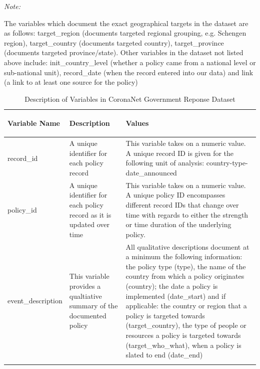 \documentclass[]{article}
\begin{document}
\begingroup\fontsize{10}{12}\selectfont

\begin{ThreePartTable}
\begin{TableNotes}[para]
\small
\item \textit{Note: } 
\item *The variables which document the exact geographical targets in the dataset are as follows: target\_region (documents targeted regional grouping, e.g. Schengen region), target\_country (documents targeted country), target\_province (documents targeted province/state). Other variables in the dataset not listed above include: init\_country\_level (whether a policy came from a national level or sub-national unit), record\_date (when the record entered into our data) and link (a link to at least one source for the policy)
\end{TableNotes}
\begin{longtable}{>{\bfseries\raggedright\arraybackslash}p{3.5cm}>{\raggedright\arraybackslash}p{5cm}>{\raggedright\arraybackslash}p{8.5cm}}
\caption{\label{tab:vardesc}Description of Variables in CoronaNet Government Reponse Dataset}\\
\toprule
\textbf{Variable Name} & \textbf{Description} & \textbf{Values}\\
\midrule
\rowcolor{gray!6}  record\_id & A unique identifier for each policy record & This variable takes on a numeric value. A unique record ID is given for the following unit of analysis: country-type-date\_announced\\
policy\_id & A unique identifier for each policy record as it is updated over time & This variable takes on a numeric value. A unique policy ID encompasses different record IDs that change over time with regards to either the strength or time duration of the underlying policy.\\
\rowcolor{gray!6}  event\_description & This variable provides a qualtiative summary of the documented policy & All qualitative descriptions document at a minimum the following information: the policy type (type), the name of the country from which a policy originates (country); the date a policy is implemented (date\_start) and if applicable:  the country or region that a policy is targeted towards (target\_country), the type of people or resources a policy is targeted towards (target\_who\_what), when a policy is slated to end (date\_end)\\
\addlinespace[0.3em]
\multicolumn{3}{l}{\textbf{Monadic Variables}}\\

\end{longtable}
\end{ThreePartTable}
\end{document}
